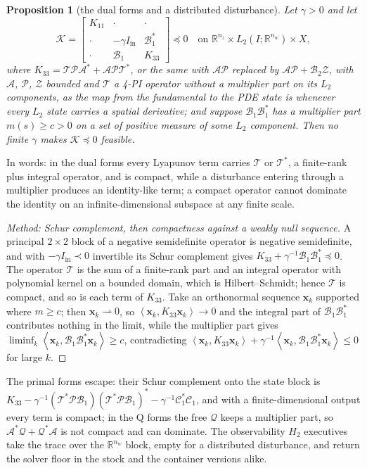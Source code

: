 \documentclass[12pt]{article}
\newcommand{\R}{\mathbb{R}}
\newcommand{\mcl}[1]{\mathcal{#1}}
\newcommand{\mbf}[1]{\mathbf{#1}}
\newcommand{\mrm}[1]{\mathrm{#1}}
\newcommand{\bmat}[1]{\begin{bmatrix} #1 \end{bmatrix}}
\newcommand{\ip}[2]{\left\langle #1,#2\right\rangle}
\theoremstyle{plain}
\newtheorem{proposition}[theorem]{Proposition}
\theoremstyle{definition}
\theoremstyle{remark}
\begin{document}
\begin{proposition}[the dual forms and a distributed disturbance]\label{prop:dualforms}
Let $\gamma>0$ and let
\[
\mcl K=\bmat{K_{11}&\cdot&\cdot\\ \cdot&-\gamma I_{\mrm{in}}&\mcl B_1^*\\ \cdot&\mcl B_1&K_{33}}\preceq0\quad\text{on }\R^{n_z}\times L_2(I;\R^{n_w})\times X,
\]
where $K_{33}=\mcl T\mcl P\mcl A^*+\mcl A\mcl P\mcl T^*$, or the same with $\mcl A\mcl P$ replaced by $\mcl A\mcl P+\mcl B_2\mcl Z$, with $\mcl A$, $\mcl P$, $\mcl Z$ bounded and $\mcl T$ a 4-PI operator without a multiplier part on its $L_2$ components, as the map from the fundamental to the PDE state is whenever every $L_2$ state carries a spatial derivative; and suppose $\mcl B_1\mcl B_1^*$ has a multiplier part $m(s)\ge c>0$ on a set of positive measure of some $L_2$ component. Then no finite $\gamma$ makes $\mcl K\preceq0$ feasible.
\end{proposition}
In words: in the dual forms every Lyapunov term carries $\mcl T$ or $\mcl T^*$, a finite-rank plus integral operator, and is compact, while a disturbance entering through a multiplier produces an identity-like term; a compact operator cannot dominate the identity on an infinite-dimensional subspace at any finite scale.
\begin{proof}[Method: Schur complement, then compactness against a weakly null sequence]
A principal $2\times2$ block of a negative semidefinite operator is negative semidefinite, and with $-\gamma I_{\mrm{in}}\prec0$ invertible its Schur complement gives $K_{33}+\gamma^{-1}\mcl B_1\mcl B_1^*\preceq0$. The operator $\mcl T$ is the sum of a finite-rank part and an integral operator with polynomial kernel on a bounded domain, which is Hilbert--Schmidt; hence $\mcl T$ is compact, and so is each term of $K_{33}$. Take an orthonormal sequence $\mbf x_k$ supported where $m\ge c$; then $\mbf x_k\rightharpoonup0$, so $\ip{\mbf x_k}{K_{33}\mbf x_k}\to0$ and the integral part of $\mcl B_1\mcl B_1^*$ contributes nothing in the limit, while the multiplier part gives $\liminf_k\ip{\mbf x_k}{\mcl B_1\mcl B_1^*\mbf x_k}\ge c$, contradicting $\ip{\mbf x_k}{K_{33}\mbf x_k}+\gamma^{-1}\ip{\mbf x_k}{\mcl B_1\mcl B_1^*\mbf x_k}\le0$ for large $k$.
\end{proof}
The primal forms escape: their Schur complement onto the state block is $K_{33}-\gamma^{-1}(\mcl T^*\mcl P\mcl B_1)(\mcl T^*\mcl P\mcl B_1)^*-\gamma^{-1}\mcl C_1^*\mcl C_1$, and with a finite-dimensional output every term is compact; in the Q forms the free $\mcl Q$ keeps a multiplier part, so $\mcl A^*\mcl Q+\mcl Q^*\mcl A$ is not compact and can dominate. The observability $H_2$ executives take the trace over the $\R^{n_w}$ block, empty for a distributed disturbance, and return the solver floor in the stock and the container versions alike.
\end{document}

